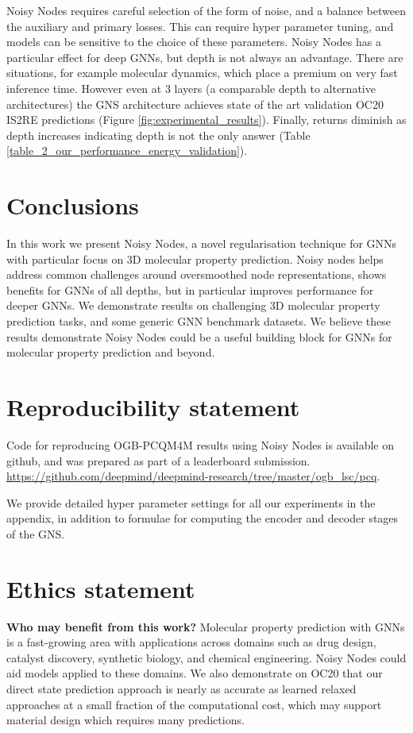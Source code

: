 \documentclass{article} \usepackage{iclr2022_conference,times}
\begin{document}
Noisy Nodes requires careful selection of the form of noise, and a balance between the auxiliary and primary losses. This can require hyper parameter tuning, and models can be sensitive to the choice of these parameters. Noisy Nodes has a particular effect for deep GNNs, but depth is not always an advantage. There are situations, for example molecular dynamics, which place a premium on very fast inference time. However even at 3 layers (a comparable depth to alternative architectures) the GNS architecture achieves state of the art validation OC20 IS2RE predictions (Figure \ref{fig:experimental_results}). Finally, returns diminish as depth increases indicating depth is not the only answer (Table \ref{table_2_our_performance_energy_validation}).

\section{Conclusions}
In this work we present Noisy Nodes, a novel regularisation technique for GNNs with particular focus on 3D molecular property prediction. Noisy nodes helps address common challenges around oversmoothed node representations, shows benefits for GNNs of all depths, but in particular improves performance for deeper GNNs. We demonstrate results on challenging 3D molecular property prediction tasks, and some generic GNN benchmark datasets. We believe these results demonstrate Noisy Nodes could be a useful building block for GNNs for molecular property prediction and beyond.



\section{Reproducibility statement}

Code for reproducing OGB-PCQM4M results using Noisy Nodes is available on github, and was prepared as part of a leaderboard submission. \url{https://github.com/deepmind/deepmind-research/tree/master/ogb_lsc/pcq}.

We provide detailed hyper parameter settings for all our experiments in the appendix, in addition to formulae for computing the encoder and decoder stages of the GNS.

\section{Ethics statement}
\textbf{Who may benefit from this work?} Molecular property prediction with GNNs is a fast-growing area with applications across domains such as drug design, catalyst discovery, synthetic biology, and chemical engineering. Noisy Nodes could aid models applied to these domains. We also demonstrate on OC20 that our direct state prediction approach is nearly as accurate as learned relaxed approaches at a small fraction of the computational cost, which may support material design which requires many predictions.
\end{document}

